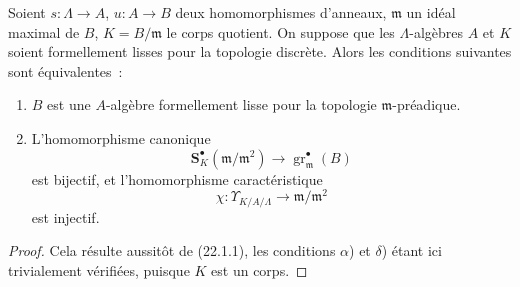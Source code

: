 \begin{corollary}[22.1.2]
\label{0.22.1.2-fr}
Soient $s:\Lambda\to A$, $u:A\to B$ deux homomorphismes d'anneaux,
$\mathfrak m$ un idéal maximal de $B$, $K=B/\mathfrak m$ le corps quotient.
On suppose que les $\Lambda$-algèbres $A$ et $K$ soient formellement lisses
pour la topologie discrète. Alors les conditions suivantes sont
équivalentes~:
\begin{enumerate}
  \item[\textup{a)}] $B$ est une $A$-algèbre formellement lisse pour la topologie
  $\mathfrak m$-préadique.
  \item[\textup{b)}] L'homomorphisme canonique
  \begin{equation}
  \tag{22.1.2.1}
  \label{0.22.1.2.1-fr}
    \mathbf S_K^\bullet(\mathfrak m/\mathfrak m^2)
    \longrightarrow\operatorname{gr}_{\mathfrak m}^\bullet(B)
  \end{equation}
  est bijectif, et l'homomorphisme caractéristique
  \begin{equation}
  \tag{22.1.2.2}
  \label{0.22.1.2.2-fr}
    \chi:\Upsilon_{K/A/\Lambda}\longrightarrow\mathfrak m/\mathfrak m^2
  \end{equation}
  est injectif.
\end{enumerate}
\end{corollary}

\begin{proof}
Cela résulte aussitôt de (22.1.1), les conditions $\alpha$) et $\delta$)
étant ici trivialement vérifiées, puisque $K$ est un corps.
\end{proof}

